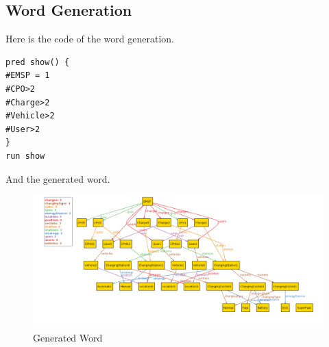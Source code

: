 \subsection{Word Generation}
Here is the code of the word generation.
\begin{verbatim}
pred show() {
#EMSP = 1
#CPO>2
#Charge>2
#Vehicle>2
#User>2
}
run show
\end{verbatim}
And the generated word.
\begin{figure}[!h]
    \includegraphics[keepaspectratio, width=16cm]{Alloy/WordResult.png}
    \caption{Generated Word}
\end{figure}
\clearpage